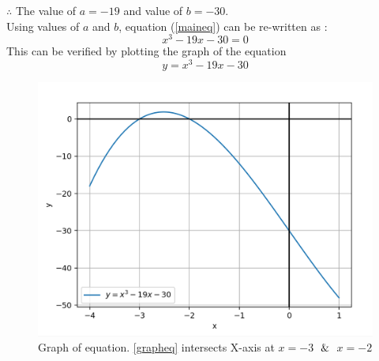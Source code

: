 \documentclass[journal,12pt,twocolumn]{IEEEtran}
\begin{document}
    
    
    


    $ \therefore $ The value of $a = -19$ and value of $b = -30$.\\
    
    Using values of $a$ and $b$, equation (\ref{maineq}) can be re-written as :
    \begin{equation}
    \label{Peq}
        x^3-19x-30=0
    \end{equation}
    This can be verified by plotting the graph of the equation
    \begin{equation}
    \label{grapheq}
        y=x^3-19x-30
    \end{equation}
    
\begin{figure}[h]
    \includegraphics[width=0.9\columnwidth]{figs/graph.png}
    \caption{Graph of equation. \ref{grapheq} intersects X-axis at $x=-3$ $\And$ $x=-2$ }
    \label{graph}

\end{figure}
\end{document}

